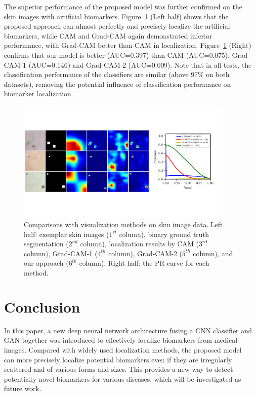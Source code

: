 \documentclass[runningheads]{llncs}
\begin{document}
The superior performance of the proposed model was further confirmed on the skin images with artificial biomarkers. Figure~\ref{fig:skin_eval} (Left half) shows that the proposed approach can almost perfectly and precisely localize the artificial biomarkers, while CAM and Grad-CAM again demonstrated inferior performance, with Grad-CAM better than CAM in localization. Figure~\ref{fig:skin_eval} (Right) confirms that our model is better (AUC=0.397) than CAM (AUC=0.075), Grad-CAM-1 (AUC=0.146) and Grad-CAM-2 (AUC=0.009). Note that in all tests, the classification performance of the classifiers are similar (above 97\% on both datasets), removing the potential influence of classification performance on biomarker localization.

\begin{figure} %
    \vspace{-0.5cm} 
	\centering 
	\includegraphics[width=0.95\textwidth]{images/skin_image_pr.pdf}
	\caption{Comparisons with visualization methods on skin image data. Left half: exemplar skin images ($1^{st}$ column), binary ground truth segmentation ($2^{nd}$ column), localization results by CAM ($3^{rd}$ column), Grad-CAM-1 ($4^{th}$ column), Grad-CAM-2 ($5^{th}$ column), and our approach ($6^{th}$ column). Right half: the PR curve for each method.}
	\label{fig:skin_eval}
	\vspace{-1.0cm}
\end{figure}


\section{Conclusion}
In this paper, a new deep neural network architecture fusing a CNN classifier and GAN together was introduced to effectively localize biomarkers from medical images. Compared with widely used localization methods, the proposed model can more precisely localize potential biomarkers even if they are irregularly scattered and of various forms and sizes. This provides a new way to detect potentially novel biomarkers for various diseases, which will be investigated as future work. 
\end{document}
